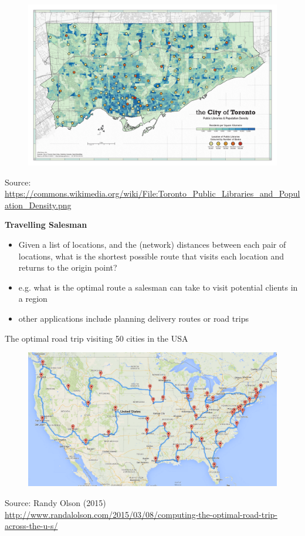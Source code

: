 \documentclass[aspectratio=169]{beamer}
\begin{document}
\begin{frame}
	
	\begin{figure}
		\centering
		\includegraphics[width=0.9\linewidth]{images/tor_libraries}
	\end{figure}
	
	\tiny Source: \url{https://commons.wikimedia.org/wiki/File:Toronto_Public_Libraries_and_Population_Density.png}
\end{frame}	

\begin{frame}

	
	\textbf{Travelling Salesman}
	
	\begin{itemize}
		\item 	Given a list of locations, and the (network) distances between each pair of locations, what is the shortest possible route that visits each location and returns to the origin point?
		\item e.g. what is the optimal route a salesman can take to visit potential clients in a region 
		\item other applications include planning delivery routes or road trips
	\end{itemize}
	
\end{frame}

\begin{frame}
	\small The optimal road trip visiting 50 cities in the USA
	\begin{figure}
		\centering
		\includegraphics[width=0.9\linewidth]{images/travel_usa}
	\end{figure}
	
	\tiny Source: Randy Olson (2015)  \url{http://www.randalolson.com/2015/03/08/computing-the-optimal-road-trip-across-the-u-s/}
\end{frame}	
\end{document}

